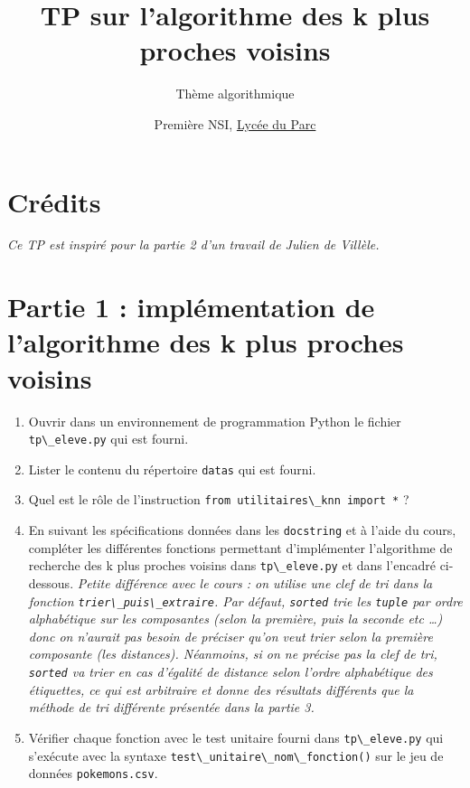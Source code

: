 \documentclass[
  11pt,
]{article}
\title{TP sur l'algorithme des k plus proches voisins}
\subtitle{Thème algorithmique}
\author{Première NSI, \href{https://frederic-junier.org/}{Lycée du
Parc}}
\date{}
\newcommand{\passthrough}[1]{#1}
\providecommand{\tightlist}{%
  \setlength{\itemsep}{0pt}\setlength{\parskip}{0pt}}
\newcounter{thme}
\newcounter{def}
\newcounter{cours}
\newcounter{alg}
\newcounter{prog}
\begin{document}
\maketitle

\renewcommand*\contentsname{Table des matières}
{
\hypersetup{linkcolor=}
\setcounter{tocdepth}{3}
\tableofcontents
}
\hypertarget{cruxe9dits}{%
\section*{Crédits}\label{cruxe9dits}}

\emph{Ce TP est inspiré pour la partie 2 d'un travail de Julien de
Villèle.}

\hypertarget{partie-1-impluxe9mentation-de-lalgorithme-des-k-plus-proches-voisins}{%
\section{Partie 1 : implémentation de l'algorithme des k plus proches
voisins}\label{partie-1-impluxe9mentation-de-lalgorithme-des-k-plus-proches-voisins}}

\begin{enumerate}
\def\labelenumi{\arabic{enumi}.}
\tightlist
\item
  Ouvrir dans un environnement de programmation Python le fichier
  \passthrough{\lstinline!tp\_eleve.py!} qui est fourni.
\item
  Lister le contenu du répertoire \passthrough{\lstinline!datas!} qui
  est fourni.
\item
  Quel est le rôle de l'instruction
  \passthrough{\lstinline!from utilitaires\_knn import *!} ?
\item
  En suivant les spécifications données dans les
  \passthrough{\lstinline!docstring!} et à l'aide du cours, compléter
  les différentes fonctions permettant d'implémenter l'algorithme de
  recherche des k plus proches voisins dans
  \passthrough{\lstinline!tp\_eleve.py!} et dans l'encadré ci-dessous.
  \emph{Petite différence avec le cours : on utilise une clef de tri
  dans la fonction \passthrough{\lstinline!trier\_puis\_extraire!}. Par
  défaut, \passthrough{\lstinline!sorted!} trie les
  \passthrough{\lstinline!tuple!} par ordre alphabétique sur les
  composantes (selon la première, puis la seconde etc \ldots) donc on
  n'aurait pas besoin de préciser qu'on veut trier selon la première
  composante (les distances). Néanmoins, si on ne précise pas la clef de
  tri, \passthrough{\lstinline!sorted!} va trier en cas d'égalité de
  distance selon l'ordre alphabétique des étiquettes, ce qui est
  arbitraire et donne des résultats différents que la méthode de tri
  différente présentée dans la partie 3.}
\item
  Vérifier chaque fonction avec le test unitaire fourni dans
  \passthrough{\lstinline!tp\_eleve.py!} qui s'exécute avec la syntaxe
  \passthrough{\lstinline!test\_unitaire\_nom\_fonction()!} sur le jeu
  de données \passthrough{\lstinline!pokemons.csv!}.
\end{enumerate}
\end{document}
